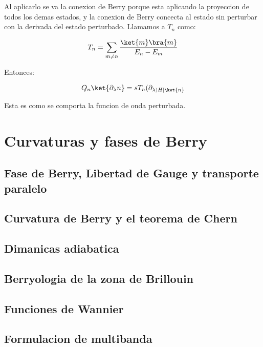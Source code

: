 \documentclass[11pt,fleqn]{book}
\begin{document}
Al aplicarlo se va la conexion de Berry porque esta aplicando la proyeccion de todos los demas estados, y la conexion de Berry concecta al estado sin perturbar con la derivada del estado perturbado. Llamamos a $T_{n}$ como:

\begin{equation}
    T_{n}=\sum_{m\neq n}\frac{\ket{m}\bra{m}}{E_{n}-E_{m}}
\end{equation}

Entonces:

\begin{equation}
    Q_{n}\ket{\partial_{\lambda}n}=sT_{n}(\partial_{\lambda)H|\ket{n}}
\end{equation}

Esta es como se comporta la funcion de onda perturbada.





















\chapter{Curvaturas y fases de Berry}
\section{Fase de Berry, Libertad de Gauge y transporte paralelo}
\section{Curvatura de Berry y el teorema de Chern}
\section{Dimanicas adiabatica}
\section{Berryologia de la zona de Brillouin}
\section{Funciones de Wannier}
\section{Formulacion de multibanda}
\end{document}
